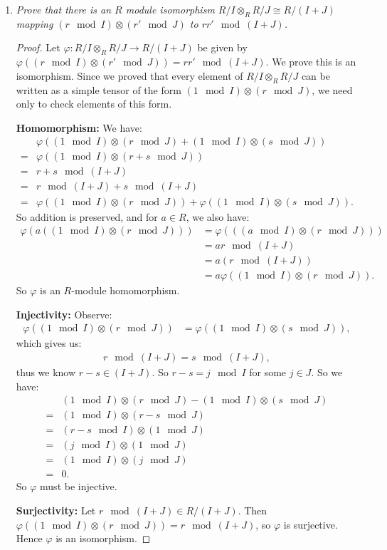 \documentclass[9pt,reqno,twoside]{amsbook}
\theoremstyle{plain}
\numberwithin{section}{chapter}
\numberwithin{equation}{chapter}
\theoremstyle{definition}
\theoremstyle{remark}
\theoremstyle{plain}
\newcommand{\bee}{\begin{equation}\begin{aligned}}
\newcommand{\eee}{\end{aligned}\end{equation}}
\newcommand{\tens}{\otimes}
\renewcommand{\phi}{\varphi}
\begin{document}
\begin{enumerate}[label=\arabic*.]
\begin{enumerate}
\item \textit{Prove that there is an $R$ module isomorphism $R/I \tens_R R/J \cong R/(I + J)$ mapping $(r \mod I) \tens (r' \mod J)$ to $rr' \mod (I + J)$. }

\begin{proof}
Let $\phi: R/I \tens_R R/J \to R/(I + J)$ be given by $\phi((r \mod I) \tens (r' \mod J)) = rr' \mod (I + J)$. We prove this is an isomorphism. Since we proved that every element of $ R/I \tens_R R/J$ can be written as a simple tensor of the form $(1 \mod I) \tens (r \mod J)$, we need only to check elements of this form.

\textbf{Homomorphism: } We have: 
\bee
&\phi((1 \mod I) \tens (r \mod J) + (1 \mod I) \tens (s \mod J))\\
=&\phi((1 \mod I) \tens (r + s \mod J))\\
=&r + s \mod (I + J)\\
=&r \mod (I + J) + s \mod (I+ J)\\
=&\phi((1 \mod I) \tens (r \mod J)) + \phi((1 \mod I) \tens (s \mod J)).
\eee
So addition is preserved, and for $a \in R$, we also have: 
\bee
\phi(a((1 \mod I) \tens (r \mod J))) &= \phi(((a \mod I) \tens (r \mod J)))\\
&= ar \mod (I + J)\\
&= a(r \mod (I + J))\\
&= a \phi((1 \mod I) \tens (r \mod J)).
\eee
So $\phi$ is an $R$-module homomorphism. 

\textbf{Injectivity: }Observe: 
\bee
\phi((1 \mod I) \tens (r \mod J)) &= \phi((1 \mod I) \tens (s \mod J)),
\eee
which gives us: 
\bee
r \mod (I + J) = s \mod (I + J),
\eee
thus we know $r - s \in (I + J)$. So $r - s = j \mod I$ for some $j \in J$. So we have: 
\bee
&(1 \mod I) \tens (r \mod J) - (1 \mod I) \tens (s \mod J)\\
=&(1 \mod I) \tens (r - s \mod J)\\
=&(r - s \mod I) \tens (1 \mod J)\\
=&(j \mod I) \tens (1 \mod J)\\
=&(1 \mod I) \tens (j \mod J)\\
=& 0.
\eee
So $\phi$ must be injective. 

\textbf{Surjectivity: }Let $r \mod (I + J) \in R/(I+ J)$. Then $\phi((1 \mod I) \tens (r \mod J)) = r \mod (I + J)$, so $\phi$ is surjective. Hence $\phi$ is an isomorphism. 
\end{proof} 
\end{enumerate}


\end{enumerate}
\end{document}
